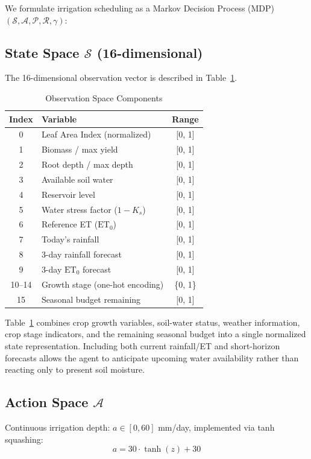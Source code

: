 \documentclass[12pt, a4paper]{article}
\begin{document}
We formulate irrigation scheduling as a Markov Decision Process (MDP) $(\mathcal{S}, \mathcal{A}, \mathcal{P}, \mathcal{R}, \gamma)$:

\subsection{State Space $\mathcal{S}$ (16-dimensional)}
The 16-dimensional observation vector is described in Table~\ref{tab:obs}.

\begin{table}[H]
\centering
\caption{Observation Space Components}
\label{tab:obs}
\begin{tabular}{clc}
\toprule
\textbf{Index} & \textbf{Variable} & \textbf{Range} \\
\midrule
0 & Leaf Area Index (normalized) & [0, 1] \\
1 & Biomass / max yield & [0, 1] \\
2 & Root depth / max depth & [0, 1] \\
3 & Available soil water & [0, 1] \\
4 & Reservoir level & [0, 1] \\
5 & Water stress factor ($1 - K_s$) & [0, 1] \\
6 & Reference ET ($\text{ET}_0$) & [0, 1] \\
7 & Today's rainfall & [0, 1] \\
8 & 3-day rainfall forecast & [0, 1] \\
9 & 3-day $\text{ET}_0$ forecast & [0, 1] \\
10--14 & Growth stage (one-hot encoding) & \{0, 1\} \\
15 & Seasonal budget remaining & [0, 1] \\
\bottomrule
\end{tabular}
\end{table}

Table~\ref{tab:obs} combines crop growth variables, soil-water status, weather information, crop stage indicators, and the remaining seasonal budget into a single normalized state representation. Including both current rainfall/ET and short-horizon forecasts allows the agent to anticipate upcoming water availability rather than reacting only to present soil moisture.

\subsection{Action Space $\mathcal{A}$}
Continuous irrigation depth: $a \in [0, 60]$ mm/day, implemented via tanh squashing:
\begin{equation}
    a = 30 \cdot \tanh(z) + 30
\end{equation}
\end{document}
